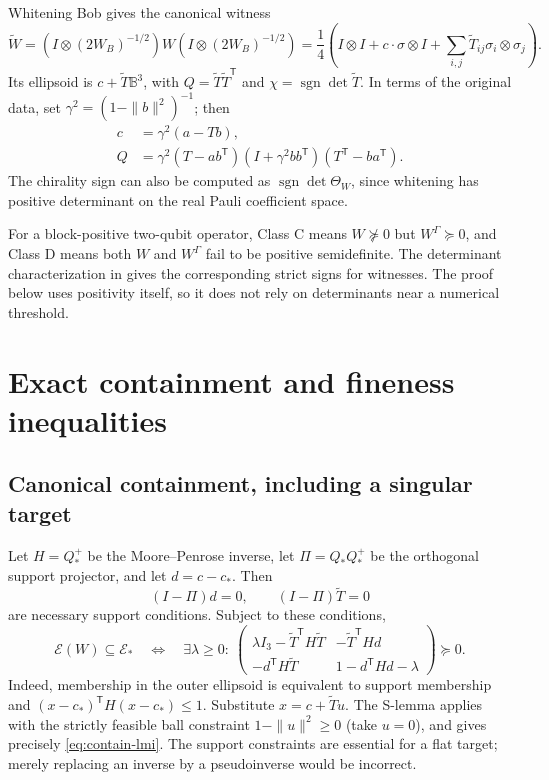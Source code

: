 \documentclass[11pt,a4paper]{article}
\theoremstyle{definition}\newtheorem{definition}[theorem]{Definition}
\newcommand{\sgn}{\operatorname{sgn}}
\newcommand{\B}{\mathbb B^3}
\newcommand{\E}{\mathcal E}
\newcommand{\II}{I\otimes I}
\newcommand{\cstar}{c_*}
\newcommand{\Qstar}{Q_*}
\theoremstyle{plain}\newtheorem*{theorem*}{Theorem}
\begin{document}
Whitening Bob gives the canonical witness
\[
 \widetilde W=(I\otimes(2W_B)^{-1/2})W(I\otimes(2W_B)^{-1/2})
 =\frac14\left(\II+c\cdot\sigma\otimes I+
 \sum_{i,j}\widetilde T_{ij}\sigma_i\otimes\sigma_j\right).
\]
Its ellipsoid is $c+\widetilde T\B$, with $Q=\widetilde T\widetilde T^{\mathsf T}$ and $\chi=\sgn\det\widetilde T$. In terms of the original data, set $\gamma^2=(1-\|b\|^2)^{-1}$; then
\begin{align}
 c&=\gamma^2(a-Tb),\\
 Q&=\gamma^2(T-ab^{\mathsf T})(I+\gamma^2bb^{\mathsf T})(T^{\mathsf T}-ba^{\mathsf T}).\label{eq:shape}
\end{align}
The chirality sign can also be computed as $\sgn\det\Theta_W$, since whitening has positive determinant on the real Pauli coefficient space.

For a block-positive two-qubit operator, Class C means $W\not\succeq0$ but $W^\Gamma\succeq0$, and Class D means both $W$ and $W^\Gamma$ fail to be positive semidefinite. The determinant characterization in \cite{milne} gives the corresponding strict signs for witnesses. The proof below uses positivity itself, so it does not rely on determinants near a numerical threshold.

\section{Exact containment and fineness inequalities}

\subsection{Canonical containment, including a singular target}

Let $H=\Qstar^+$ be the Moore--Penrose inverse, let $\Pi=\Qstar\Qstar^+$ be the orthogonal support projector, and let $d=c-\cstar$. Then
\begin{equation}\label{eq:contain-support}
 (I-\Pi)d=0,\qquad (I-\Pi)\widetilde T=0
\end{equation}
are necessary support conditions. Subject to these conditions,
\begin{equation}\label{eq:contain-lmi}
 \E(W)\subseteq\E_*
 \quad\Longleftrightarrow\quad
 \exists\lambda\geq0:\
 \begin{pmatrix}
 \lambda I_3-\widetilde T^{\mathsf T}H\widetilde T&-\widetilde T^{\mathsf T}Hd\\
 -d^{\mathsf T}H\widetilde T&1-d^{\mathsf T}Hd-\lambda
 \end{pmatrix}\succeq0.
\end{equation}
Indeed, membership in the outer ellipsoid is equivalent to support membership and $(x-\cstar)^{\mathsf T}H(x-\cstar)\leq1$. Substitute $x=c+\widetilde T u$. The S-lemma \cite{polik} applies with the strictly feasible ball constraint $1-\|u\|^2\geq0$ (take $u=0$), and gives precisely \eqref{eq:contain-lmi}. The support constraints are essential for a flat target; merely replacing an inverse by a pseudoinverse would be incorrect.
\end{document}
